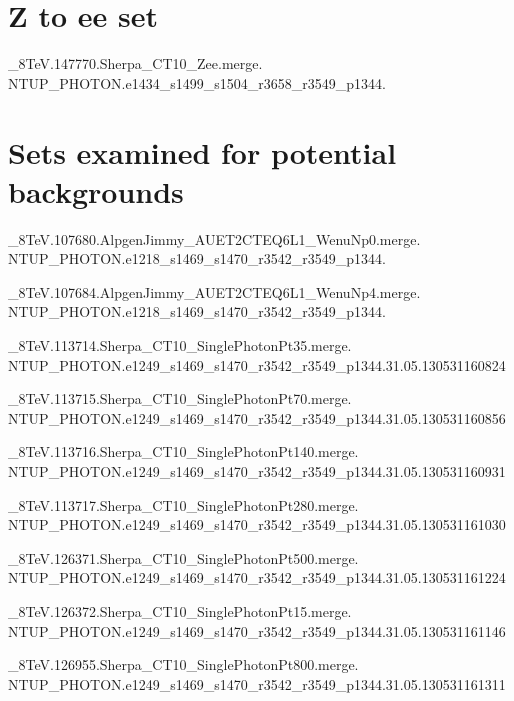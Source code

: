 \section{Z to ee set}\label{ax.zee}

\_8TeV.147770.Sherpa\_CT10\_Zee.merge. \\NTUP\_PHOTON.e1434\_s1499\_s1504\_r3658\_r3549\_p1344.

\section{Sets examined for potential backgrounds}\label{ax.other}
\_8TeV.107680.AlpgenJimmy\_AUET2CTEQ6L1\_WenuNp0.merge. \\NTUP\_PHOTON.e1218\_s1469\_s1470\_r3542\_r3549\_p1344.

\_8TeV.107684.AlpgenJimmy\_AUET2CTEQ6L1\_WenuNp4.merge. \\NTUP\_PHOTON.e1218\_s1469\_s1470\_r3542\_r3549\_p1344.

\_8TeV.113714.Sherpa\_CT10\_SinglePhotonPt35.merge. \\NTUP\_PHOTON.e1249\_s1469\_s1470\_r3542\_r3549\_p1344.31.05.130531160824

\_8TeV.113715.Sherpa\_CT10\_SinglePhotonPt70.merge. \\NTUP\_PHOTON.e1249\_s1469\_s1470\_r3542\_r3549\_p1344.31.05.130531160856

\_8TeV.113716.Sherpa\_CT10\_SinglePhotonPt140.merge. \\NTUP\_PHOTON.e1249\_s1469\_s1470\_r3542\_r3549\_p1344.31.05.130531160931

\_8TeV.113717.Sherpa\_CT10\_SinglePhotonPt280.merge. \\NTUP\_PHOTON.e1249\_s1469\_s1470\_r3542\_r3549\_p1344.31.05.130531161030

\_8TeV.126371.Sherpa\_CT10\_SinglePhotonPt500.merge. \\NTUP\_PHOTON.e1249\_s1469\_s1470\_r3542\_r3549\_p1344.31.05.130531161224

\_8TeV.126372.Sherpa\_CT10\_SinglePhotonPt15.merge. \\NTUP\_PHOTON.e1249\_s1469\_s1470\_r3542\_r3549\_p1344.31.05.130531161146

\_8TeV.126955.Sherpa\_CT10\_SinglePhotonPt800.merge. \\NTUP\_PHOTON.e1249\_s1469\_s1470\_r3542\_r3549\_p1344.31.05.130531161311

